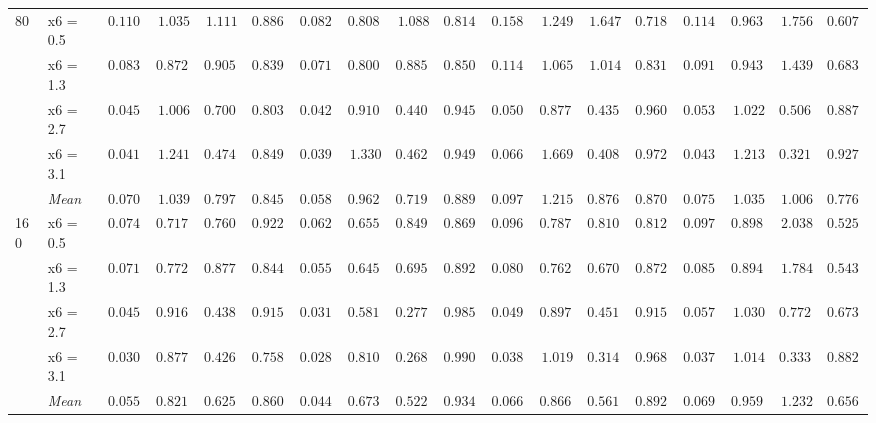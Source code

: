 \begin{table}[htbp]
\begin{tabular}{llrrrrrrrrrrrrrrrr}
\multirow{5}{*}{80} & x6 = 0.5 & $0.1109$ & $1.035$ & $1.111$ & {\boldmath$0.8867$} & {\boldmath$0.0822$} & {\boldmath$0.8085$} & {\boldmath$1.088$} & $0.8145$ & $0.1585$ & $1.249$ & $1.647$ & $0.7188$ & $0.1140$ & $0.9631$ & $1.756$ & $0.6074$ \\
 & x6 = 1.3 & $0.0835$ & $0.8720$ & $0.9051$ & $0.8398$ & {\boldmath$0.0712$} & {\boldmath$0.8004$} & {\boldmath$0.8857$} & {\boldmath$0.8506$} & $0.1148$ & $1.065$ & $1.014$ & $0.8311$ & $0.0913$ & $0.9432$ & $1.439$ & $0.6836$ \\
 & x6 = 2.7 & $0.0455$ & $1.006$ & $0.7002$ & $0.8037$ & {\boldmath$0.0422$} & $0.9101$ & $0.4403$ & {\boldmath$0.9453$} & $0.0500$ & {\boldmath$0.8773$} & {\boldmath$0.4351$} & $0.9609$ & $0.0534$ & $1.022$ & $0.5069$ & $0.8877$ \\
 & x6 = 3.1 & $0.0413$ & $1.241$ & $0.4745$ & $0.8496$ & {\boldmath$0.0392$} & $1.330$ & $0.4623$ & {\boldmath$0.9492$} & $0.0666$ & $1.669$ & $0.4085$ & $0.9727$ & $0.0439$ & {\boldmath$1.213$} & {\boldmath$0.3215$} & $0.9277$ \\
 & \textit{Mean} & $0.0703$ & $1.039$ & $0.7977$ & $0.8450$ & \colorbox{green!20}{\boldmath$0.0587$} & \colorbox{green!20}{\boldmath$0.9623$} & \colorbox{green!20}{\boldmath$0.7190$} & \colorbox{green!20}{\boldmath$0.8899$} & $0.0975$ & $1.215$ & $0.8763$ & $0.8708$ & $0.0757$ & $1.035$ & $1.006$ & $0.7766$ \\
\midrule
\multirow{5}{*}{160} & x6 = 0.5 & $0.0745$ & $0.7178$ & {\boldmath$0.7606$} & {\boldmath$0.9229$} & {\boldmath$0.0629$} & {\boldmath$0.6550$} & $0.8499$ & $0.8691$ & $0.0968$ & $0.7871$ & $0.8105$ & $0.8125$ & $0.0978$ & $0.8982$ & $2.038$ & $0.5254$ \\
 & x6 = 1.3 & $0.0714$ & $0.7728$ & $0.8774$ & $0.8447$ & {\boldmath$0.0553$} & {\boldmath$0.6459$} & $0.6958$ & {\boldmath$0.8926$} & $0.0807$ & $0.7628$ & {\boldmath$0.6706$} & $0.8721$ & $0.0852$ & $0.8944$ & $1.784$ & $0.5430$ \\
 & x6 = 2.7 & $0.0455$ & $0.9164$ & $0.4389$ & {\boldmath$0.9150$} & {\boldmath$0.0311$} & {\boldmath$0.5816$} & {\boldmath$0.2776$} & $0.9854$ & $0.0499$ & $0.8979$ & $0.4515$ & $0.9150$ & $0.0575$ & $1.030$ & $0.7724$ & $0.6738$ \\
 & x6 = 3.1 & $0.0300$ & $0.8778$ & $0.4265$ & $0.7588$ & {\boldmath$0.0287$} & {\boldmath$0.8104$} & {\boldmath$0.2681$} & $0.9902$ & $0.0389$ & $1.019$ & $0.3144$ & {\boldmath$0.9688$} & $0.0374$ & $1.014$ & $0.3331$ & $0.8828$ \\
 & \textit{Mean} & $0.0553$ & $0.8212$ & $0.6258$ & $0.8604$ & \colorbox{green!20}{\boldmath$0.0445$} & \colorbox{green!20}{\boldmath$0.6732$} & \colorbox{green!20}{\boldmath$0.5228$} & \colorbox{green!20}{\boldmath$0.9343$} & $0.0666$ & $0.8666$ & $0.5618$ & $0.8921$ & $0.0695$ & $0.9592$ & $1.232$ & $0.6562$ \\
\bottomrule
\end{tabular}
\end{table}
